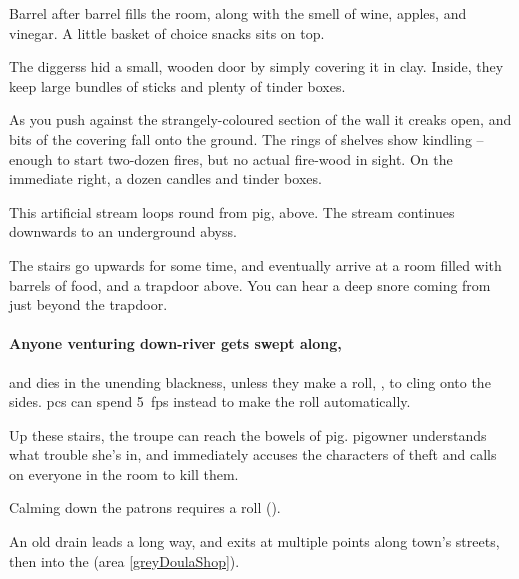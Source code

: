 \begin{multicols}{2}
\begin{boxtext}
  Barrel after barrel fills the room, along with the smell of wine, apples, and vinegar.
  A little basket of choice snacks sits on top.
\end{boxtext}


The \glspl{diggers} hid a small, wooden door by simply covering it in clay.
Inside, they keep large bundles of sticks and plenty of tinder boxes.

\begin{boxtext}
  As you push against the strangely-coloured section of the wall it creaks open, and bits of the covering fall onto the ground.
  The rings of shelves show kindling -- enough to start two-dozen fires, but no actual fire-wood in sight.
  On the immediate right, a dozen candles and tinder boxes.
\end{boxtext}


This artificial stream loops round from \gls{pig}, above.
The stream continues downwards to an underground abyss.

\begin{boxtext}
  The stairs go upwards for some time, and eventually arrive at a room filled with barrels of food, and a trapdoor above.
  You can hear a deep snore coming from just beyond the trapdoor.
\end{boxtext}

\paragraph{Anyone venturing down-river gets swept along,}
and dies in the unending blackness, unless they make a  roll, \tn[10], to cling onto the sides.
\Glspl{pc} can spend 5~\glspl{fp} instead to make the roll automatically.


Up these stairs, the troupe can reach the bowels of \gls{pig}.
\Gls{pigowner} understands what trouble she's in, and immediately accuses the characters of theft and calls on everyone in the room to kill them.

Calming down the patrons requires a  roll (\tn[10]).


An old drain leads a long way, and exits at multiple points along \gls{town}'s streets, then into the  (area \vref{greyDoulaShop}).

\end{multicols}
